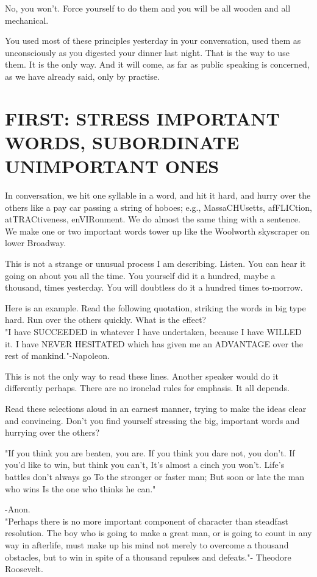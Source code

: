 \documentclass[10pt]{article}
\begin{document}
No, you won't. Force yourself to do them and you will be all wooden and all mechanical.

You used most of these principles yesterday in your conversation, used them as unconsciously as you digested your dinner last night. That is the way to use them. It is the only way. And it will come, as far as public speaking is concerned, as we have already said, only by practise.

\section*{FIRST: STRESS IMPORTANT WORDS, SUBORDINATE UNIMPORTANT ONES}
In conversation, we hit one syllable in a word, and hit it hard, and hurry over the others like a pay car passing a string of hoboes; e.g., MassaCHUsetts, afFLICtion, atTRACtiveness, enVIRonment. We do almost the same thing with a sentence. We make one or two important words tower up like the Woolworth skyscraper on lower Broadway.

This is not a strange or unusual process I am describing. Listen. You can hear it going on about you all the time. You yourself did it a hundred, maybe a thousand, times yesterday. You will doubtless do it a hundred times to-morrow.

Here is an example. Read the following quotation, striking the words in big type hard. Run over the others quickly. What is the effect?\\
"I have SUCCEEDED in whatever I have undertaken, because I have WILLED it. I have NEVER HESITATED which has given me an ADVANTAGE over the rest of mankind."-Napoleon.

This is not the only way to read these lines. Another speaker would do it differently perhaps. There are no ironclad rules for emphasis. It all depends.

Read these selections aloud in an earnest manner, trying to make the ideas clear and convincing. Don't you find yourself stressing the big, important words and hurrying over the others?

\begin{displayquote}
"If you think you are beaten, you are. If you think you dare not, you don't. If you'd like to win, but think you can't, It's almost a cinch you won't. Life's battles don't always go To the stronger or faster man; But soon or late the man who wins Is the one who thinks he can."
\end{displayquote}

-Anon.\\
"Perhaps there is no more important component of character than steadfast resolution. The boy who is going to make a great man, or is going to count in any way in afterlife, must make up his mind not merely to overcome a thousand obstacles, but to win in spite of a thousand repulses and defeats."- Theodore Roosevelt.
\end{document}
